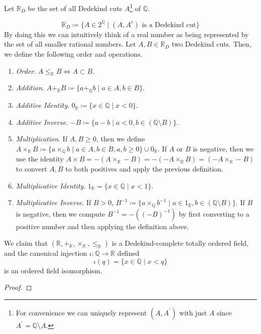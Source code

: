   \begin{definition}
    Let $\mathbb{R}_D$ be the set of all Dedekind cuts $A$\footnote{For convenience we can uniquely represent $(A, A^\prime)$ with just $A$ since $A^\prime = \mathbb{Q} \setminus A$. }  of $\mathbb{Q}$. 

    \begin{equation}
      \mathbb{R}_D \coloneqq \{ A \in 2^{\mathbb{Q}} \mid (A, A^c) \text{ is a Dedekind cut}\}
    \end{equation}
    By doing this we can intuitively think of a real number as being represented by the set of all smaller rational numbers. Let $A, B \in \mathbb{R}_D$ two Dedekind cuts. Then, we define the following order and operations. 
    \begin{enumerate}
      \item \textit{Order}. $A \leq_{\mathbb{R}} B \iff A \subset B$. 
      \item \textit{Addition}. $A +_{\mathbb{R}} B \coloneqq \{ a +_{\mathbb{Q}} b \mid a \in A, b \in B \}$. 
      \item \textit{Additive Identity}. $0_{\mathbb{R}} \coloneqq \{x \in \mathbb{Q} \mid x < 0 \}$. 
      \item \textit{Additive Inverse}. $-B \coloneqq \{ a - b \mid a < 0 , b \in (\mathbb{Q} \setminus B) \}$.
      \item \textit{Multiplication}. If $A, B \geq 0$, then we define $A \times_{\mathbb{R}} B \coloneqq \{ a \times_{\mathbb{Q}} b \mid a \in A, b \in B, a, b \geq 0\} \cup 0_{\mathbb{R}}$. If $A$ or $B$ is negative, then we use the identity $A \times B = -(A \times_{\mathbb{R}} -B) = -(-A \times_{\mathbb{R}} B) = (-A \times_{\mathbb{R}} -B)$ to convert $A, B$ to both positives and apply the previous definition. 
      \item \textit{Multiplicative Identity}. $1_{\mathbb{R}} = \{x \in \mathbb{Q} \mid x < 1 \}$. 
      \item \textit{Multiplicative Inverse}. If $B > 0$, $B^{-1} \coloneqq \{ a \times_{\mathbb{Q}} b^{-1} \mid a \in 1_{\mathbb{R}}, b \in (\mathbb{Q} \setminus B) \}$. If $B$ is negative, then we compute $B^{-1} = -((-B)^{-1})$ by first converting to a positive number and then applying the definition above. 
    \end{enumerate}

    We claim that $(\mathbb{R}, +_{\mathbb{R}}, \times_{\mathbb{R}}, \leq_{\mathbb{R}})$ is a Dedekind-complete totally ordered field, and the canonical injection $\iota: \mathbb{Q} \rightarrow \mathbb{R}$ defined 
    \begin{equation}
      \iota(q) = \{x \in \mathbb{Q} \mid x < q \}
    \end{equation}
    is an ordered field isomorphism. 
  \end{definition} 
  \begin{proof}
    
  \end{proof}

